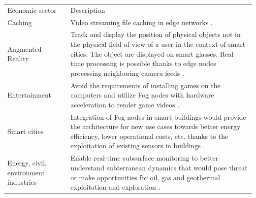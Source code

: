 \documentclass[11pt]{sdm}
\begin{document}
\begin{table}[t]
	\fontsize{10}{8}\selectfont
	\begin{tabular}{@{} p{3cm}|p{12cm} @{}}
		Economic sector & Description
		\\[2ex]
		\cmidrule[1pt]{1-2}
		Caching
		& Video streaming file caching in edge networks \cite{ma_understanding_2017}.
		\\
		Augmented Reality
		& Track and display the position of physical objects not in the physical field of view of a user in the context of smart cities. The object are displayed on smart glasses. Real-time processing is possible thanks to edge nodes processing neighboring camera feeds \cite{rausch_towards_2021, rausch_cognitivexr_2020}.
		\\
		Entertainment 
		& Avoid the requirements of installing games on the computers and utilize Fog nodes with hardware acceleration to render game videos \cite{lin_cloudfog_2017}.
		\\
		Smart cities 
		& Integration of Fog nodes in smart buildings would provide the architecture for new use cases towards better energy efficiency, lower operational costs, etc. thanks to the exploitation of existing sensors in buildings \cite{ieee_standards_association_smart_2018}.
		\\
		Energy, civil, environment industries 
		& Enable real-time subsurface monitoring to better understand subterranean dynamics that would pose threat or make opportunities for oil, gas and geothermal exploitation and exploration \cite{openfog_consortium_real-time_2018}.
		\\

\end{tabular}
\end{table}
\end{document}
